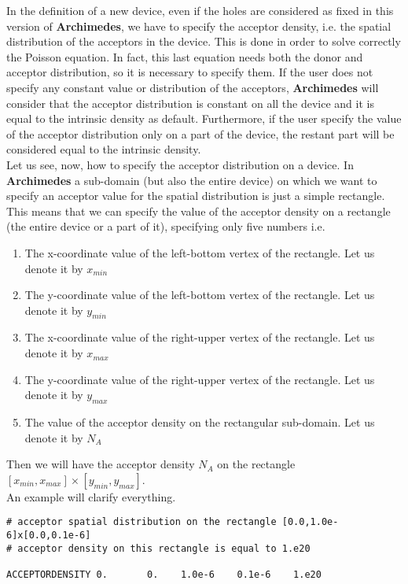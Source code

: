 \documentclass[12pt]{book}
\begin{document}
In the definition of a new device, even if the holes are considered as fixed in this version of \textbf{Archimedes}, we have to specify the acceptor density, i.e. the spatial distribution of the acceptors in the device. This is done in order to solve correctly the Poisson equation. In fact, this last equation needs both the donor and acceptor distribution, so it is necessary to specify them. If the user does not specify any constant value or distribution of the acceptors, \textbf{Archimedes} will consider that the acceptor distribution is constant on all the device and it is equal to the intrinsic density as default. Furthermore, if the user specify the value of the acceptor distribution only on a part of the device, the restant part will be considered equal to the intrinsic density.
\\
Let us see, now, how to specify the acceptor distribution on a device.
In \textbf{Archimedes} a sub-domain (but also the entire device) on which we want to specify an acceptor value for the spatial distribution is just a simple rectangle. This means that we can specify the value of the acceptor density on a rectangle (the entire device or a part of it), specifying only five numbers i.e.
\begin{enumerate}
\item
The x-coordinate value of the left-bottom vertex of the rectangle. Let us denote it by $x_{min}$
\item
The y-coordinate value of the left-bottom vertex of the rectangle. Let us denote it by $y_{min}$
\item
The x-coordinate value of the right-upper vertex of the rectangle. Let us denote it by $x_{max}$
\item
The y-coordinate value of the right-upper vertex of the rectangle. Let us denote it by $y_{max}$
\item
The value of the acceptor density on the rectangular sub-domain. Let us denote it by $N_A$
\end{enumerate}
Then we will have the acceptor density $N_A$ on the rectangle $[x_{min},x_{max}] \times [y_{min},y_{max}]$.\\

An example will clarify everything.

\begin{verbatim}
# acceptor spatial distribution on the rectangle [0.0,1.0e-6]x[0.0,0.1e-6]
# acceptor density on this rectangle is equal to 1.e20

ACCEPTORDENSITY 0.       0.    1.0e-6    0.1e-6    1.e20

\end{verbatim}
\end{document}
